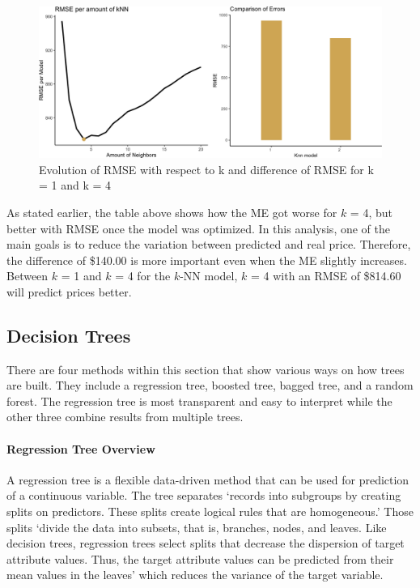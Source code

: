 \documentclass[
  paper=a4,
  ,captions=tableheading
]{scrartcl}
\begin{document}
\begin{figure}[H]

{\centering \includegraphics[width=0.5\linewidth,]{Diamonds_PDF_files/figure-latex/knn double plot-1}

}

\caption{Evolution of RMSE with respect to k and difference of RMSE for k = 1 and k = 4}\label{fig:knn double plot}
\end{figure}

As stated earlier, the table above shows how the ME got worse for \(k\)
= 4, but better with RMSE once the model was optimized. In this
analysis, one of the main goals is to reduce the variation between
predicted and real price. Therefore, the difference of \$140.00 is more
important even when the ME slightly increases. Between \(k\) = 1 and
\(k\) = 4 for the \(k\)-NN model, \(k\) = 4 with an RMSE of \$814.60
will predict prices better.

\hypertarget{decision-trees}{%
\subsection{Decision Trees}\label{decision-trees}}

There are four methods within this section that show various ways on how
trees are built. They include a regression tree, boosted tree, bagged
tree, and a random forest. The regression tree is most transparent and
easy to interpret while the other three combine results from multiple
trees.

\hypertarget{regression-tree-overview}{%
\paragraph{Regression Tree Overview}\label{regression-tree-overview}}

A regression tree is a flexible data-driven method that can be used for
prediction of a continuous variable. The tree separates `records into
subgroups by creating splits on predictors. These splits create logical
rules that are homogeneous.' Those splits `divide the data into subsets,
that is, branches, nodes, and leaves. Like decision trees, regression
trees select splits that decrease the dispersion of target attribute
values. Thus, the target attribute values can be predicted from their
mean values in the leaves' which reduces the variance of the target
variable.
\end{document}
